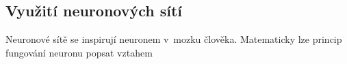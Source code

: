 




\subsection{Využití neuronových sítí}
\label{chap:asr:acoustic:DNN}

Neuronové sítě se inspirují neuronem v~mozku člověka.
Matematicky lze princip fungování neuronu popsat vztahem

